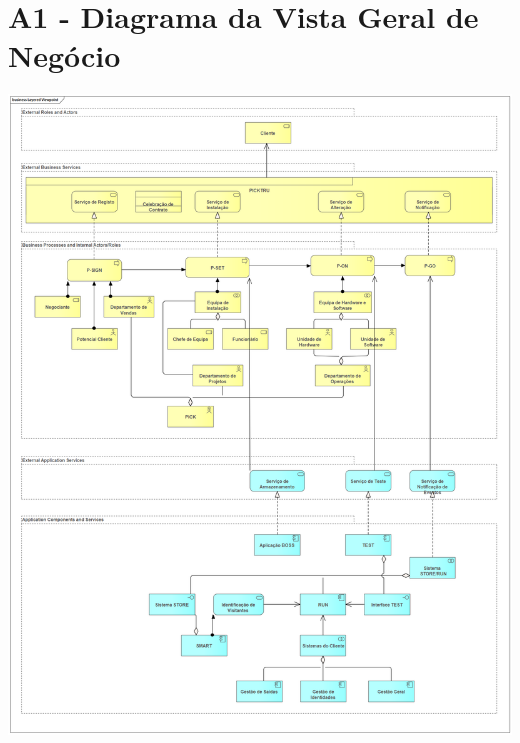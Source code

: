 \documentclass{article}
\begin{document}
\section*{A1 - Diagrama da Vista Geral de Negócio}
\vspace*{\fill}
\includegraphics[width=\textwidth,height=\textheight,keepaspectratio]{A1-2}
\vspace*{\fill}

\pagebreak
\end{document}
